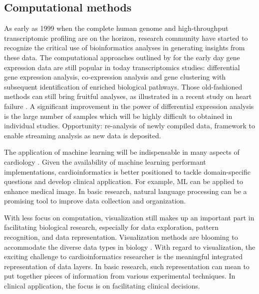 \documentclass[letter]{bioinfo}
\begin{document}
%
%
%
%

\subsection{Computational methods}


As early as 1999 when the complete human genome and high-throughput transcriptomic profiling are on the horizon, research community have started to recognize the critical use of bioinformatics analyses in generating insights from these data. The computational approaches outlined by \cite{Claverie:1999:Computational} for the early day gene expression data are still popular in today transcriptomics studies: differential gene expression analysis, co-expression analysis and gene clustering with subsequent identification of enriched biological pathways. Those old-fashioned methods can still bring fruitful analyses, as illustrated in a recent study on heart failure \citep{Santolini:2018:personalized}. A significant improvement in the power of differential expression analysis is the large number of samples which will be highly difficult to obtained in individual studies. Opportunity: re-analysis of newly compiled data, framework to enable streaming analysis as new data is deposited.

The application of machine learning will be indispensable in many aspects of cardiology \citep{Shameer:2017:Translational,Shameer:2018:Machine}. Given the availability of machine learning performant implementations, cardioinformatics is better positioned to tackle domain-specific questions and develop clinical application. For example, ML can be applied to enhance medical image. In basic research, natural language processing can be a promising tool to improve data collection and organization.


With less focus on computation, visualization still makes up an important part in facilitating biological research, especially for data exploration, pattern recognition, and data representation. Visualization methods are blooming to accommodate the diverse data types in biology \citep{Pavlopoulos:2015:Visualizing}. With regard to visualization, the exciting challenge to cardioinformatics researcher is the meaningful integrated representation of data layers. In basic research, such representation can mean to put together pieces of information from various experimental techniques. In clinical application, the focus is on facilitating clinical decisions.
\end{document}

